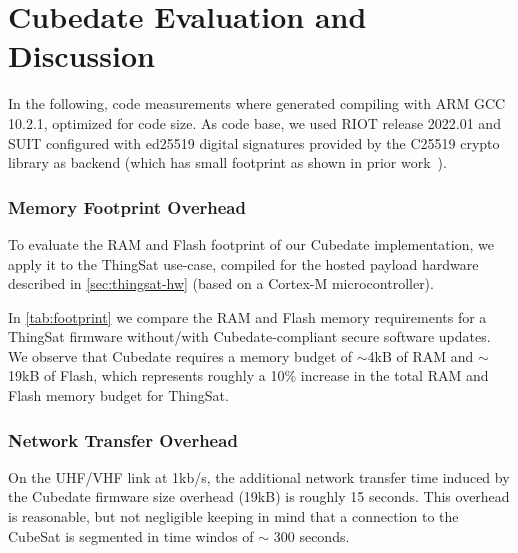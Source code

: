 \section{Cubedate Evaluation and Discussion}
\label{sec:evaluation}



In the following, code measurements where generated compiling with ARM GCC 10.2.1,
optimized for code size. As code base, we used RIOT release 2022.01 and SUIT configured with ed25519 digital signatures provided by the C25519 crypto library as backend (which has small footprint as shown in prior work~\cite{zandberg2019secure}).

\subsubsection{Memory Footprint Overhead}

To evaluate the RAM and Flash footprint of our Cubedate implementation, we apply it to the ThingSat use-case, compiled for the hosted payload hardware described in \autoref{sec:thingsat-hw} (based on a Cortex-M microcontroller).

In \autoref{tab:footprint} we compare the RAM and Flash memory requirements for a ThingSat firmware without/with Cubedate-compliant secure software updates.
We observe that Cubedate requires a memory budget of $\sim$4kB of RAM and $\sim$19kB of Flash, which represents roughly a 10\% increase in the total RAM and Flash memory budget for ThingSat.

\subsubsection{Network Transfer Overhead}
On the UHF/VHF link at 1kb/s, the additional network transfer time induced by the Cubedate firmware size overhead (19kB) is roughly 15 seconds. This overhead is reasonable, but not negligible keeping in mind that a connection to the CubeSat is segmented in time windos of $\sim$ 300 seconds.

